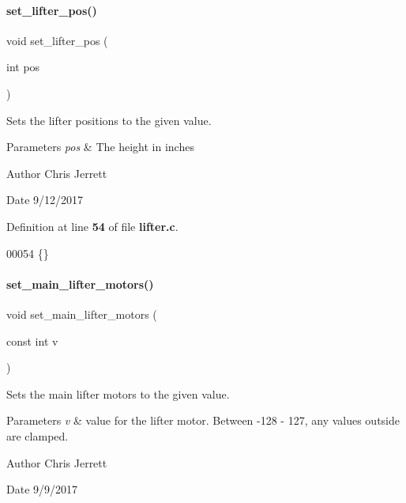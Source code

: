 \paragraph{set\+\_\+lifter\+\_\+pos()}
{\footnotesize\ttfamily void set\+\_\+lifter\+\_\+pos (\begin{DoxyParamCaption}\item[{int}]{pos }\end{DoxyParamCaption})}



Sets the lifter positions to the given value. 


\begin{DoxyParams}{Parameters}
{\em pos} & The height in inches \\
\hline
\end{DoxyParams}
\begin{DoxyAuthor}{Author}
Chris Jerrett 
\end{DoxyAuthor}
\begin{DoxyDate}{Date}
9/12/2017 
\end{DoxyDate}


Definition at line \textbf{ 54} of file \textbf{ lifter.\+c}.


\begin{DoxyCode}
00054 \{\}
\end{DoxyCode}
\mbox{\label{a00026_ad00a195af30f246924d6e1a30095b882}} 
\paragraph{set\+\_\+main\+\_\+lifter\+\_\+motors()}
{\footnotesize\ttfamily void set\+\_\+main\+\_\+lifter\+\_\+motors (\begin{DoxyParamCaption}\item[{const int}]{v }\end{DoxyParamCaption})}



Sets the main lifter motors to the given value. 


\begin{DoxyParams}{Parameters}
{\em v} & value for the lifter motor. Between -\/128 -\/ 127, any values outside are clamped. \\
\hline
\end{DoxyParams}
\begin{DoxyAuthor}{Author}
Chris Jerrett 
\end{DoxyAuthor}
\begin{DoxyDate}{Date}
9/9/2017 
\end{DoxyDate}


